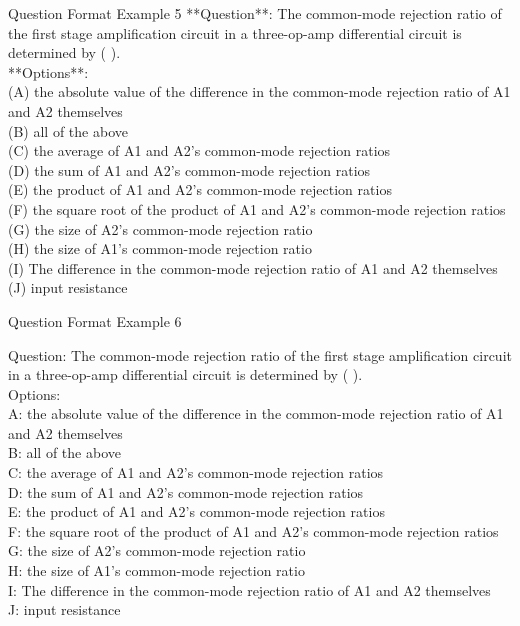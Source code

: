 \begin{promptbox}{Question Format Example 5}
**Question**:  
The common-mode rejection ratio of the first stage amplification circuit in a three-op-amp differential circuit is determined by ( ).  
\\
**Options**:  
\\
(A) the absolute value of the difference in the common-mode rejection ratio of A1 and A2 themselves  
\\
(B) all of the above  
\\
(C) the average of A1 and A2's common-mode rejection ratios  
\\
(D) the sum of A1 and A2's common-mode rejection ratios  
\\
(E) the product of A1 and A2's common-mode rejection ratios  
\\
(F) the square root of the product of A1 and A2's common-mode rejection ratios  
\\
(G) the size of A2's common-mode rejection ratio  
\\
(H) the size of A1's common-mode rejection ratio  
\\
(I) The difference in the common-mode rejection ratio of A1 and A2 themselves  
\\
(J) input resistance  

\end{promptbox}



\begin{promptbox}{Question Format Example 6}

Question: The common-mode rejection ratio of the first stage amplification circuit in a three-op-amp differential circuit is determined by ( ).  
\\
Options:  
\\
A: the absolute value of the difference in the common-mode rejection ratio of A1 and A2 themselves  
\\
B: all of the above  
\\
C: the average of A1 and A2's common-mode rejection ratios  
\\
D: the sum of A1 and A2's common-mode rejection ratios  
\\
E: the product of A1 and A2's common-mode rejection ratios  
\\
F: the square root of the product of A1 and A2's common-mode rejection ratios  
\\
G: the size of A2's common-mode rejection ratio  
\\
H: the size of A1's common-mode rejection ratio  
\\
I: The difference in the common-mode rejection ratio of A1 and A2 themselves  
\\
J: input resistance  

\end{promptbox}
